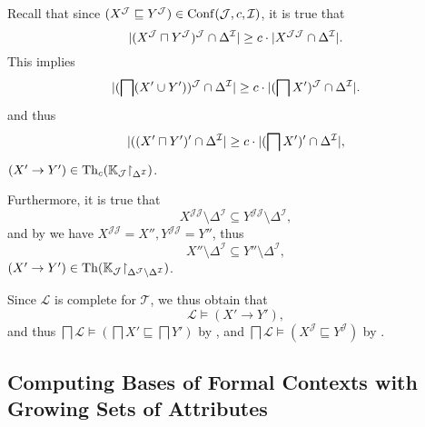 \begin{Proof}
  Recall that since $(X^{\mathcal{J}} \sqsubseteq Y^{\mathcal{J}}) \in \operatorname{Conf}(\mathcal{J},
  c, \mathcal{I})$, it is true that
  \begin{equation*}
    \lvert (X^{\mathcal{J}} \sqcap Y^{\mathcal{J}})^{\mathcal{J}} \cap \Delta^{\mathcal{I}}
      \rvert \ge c \cdot \lvert X^{\mathcal{J}\mathcal{J}} \cap \Delta^{\mathcal{I}} \rvert.
  \end{equation*}
  This implies
  \begin{equation*}
    \lvert (\bigsqcap (X' \cup Y'))^{\mathcal{J}} \cap \Delta^{\mathcal{I}}
      \rvert \ge c \cdot \lvert (\bigsqcap X')^{\mathcal{J}} \cap \Delta^{\mathcal{I}} \rvert.
  \end{equation*}
  and thus
  \begin{equation*}
    \lvert ((X' \sqcap Y')' \cap \Delta^{\mathcal{I}} \rvert \ge c \cdot \lvert (\bigsqcap X')'
      \cap \Delta^{\mathcal{I}}\rvert,
  \end{equation*}
  \ie $(X' \to Y') \in \operatorname{Th}_{c}({\mathbb{K}}_{\mathcal{J}} \mathord{\upharpoonright}_{\Delta^{\mathcal{I}}})$.

  Furthermore, it is true that
  \begin{equation*}
    X^{\mathcal{J}\mathcal{J}} \setminus \Delta^{\mathcal{I}} \subseteq Y^{\mathcal{J}\mathcal{J}} \setminus
    \Delta^{\mathcal{I}},
  \end{equation*}
  and by  we have $X^{\mathcal{J}\mathcal{J}} = X'',
  Y^{\mathcal{J}\mathcal{J}} = Y''$, thus
  \begin{equation*}
    X'' \setminus \Delta^{\mathcal{I}} \subseteq Y'' \setminus \Delta^{\mathcal{I}},
  \end{equation*}
  \ie $(X' \to Y') \in \operatorname{Th}({\mathbb{K}}_{\mathcal{J}} \mathord{\upharpoonright}_{\Delta^{\mathcal{J}} \setminus
    \Delta^{\mathcal{I}}})$.

  Since $\mathcal{L}$ is complete for $\mathcal{T}$, we thus obtain that
  \begin{equation*}
    \mathcal{L} \models (X' \to Y'),
  \end{equation*}
  and thus $\bigsqcap \mathcal{L} \models (\bigsqcap X' \sqsubseteq \bigsqcap Y')$ by
  , and $\bigsqcap \mathcal{L}
  \models (X^{\mathcal{J}} \sqsubseteq Y^{\mathcal{J}})$ by .
\end{Proof}

\subsection{Computing Bases of Formal Contexts with Growing Sets of Attributes}
\label{sec:grow-sets-attr-1}

